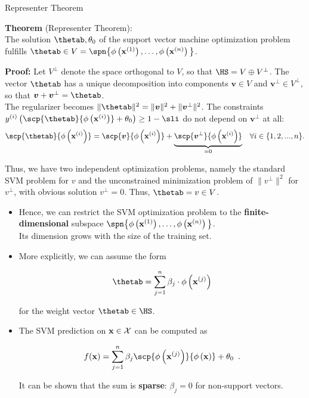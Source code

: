 \documentclass[11pt,compress,t,notes=noshow, xcolor=table]{beamer}
\begin{document}
\begin{vbframe}{Representer Theorem}

  \textbf{Theorem} (Representer Theorem):\\
  The solution $\thetab, \theta_0$ of the support vector machine optimization problem fulfills $\thetab \in V = \spn\big\{\phi\left(\xv^{(1)}\right), \dots, \phi\left(\xv^{(n)}\right)\big\}$.\\

  \vspace*{0.2cm}

  \begin{footnotesize}
  \textbf{Proof:} Let $V^\perp$ denote the space orthogonal to $V$,
  so that $\HS = V \oplus V^\perp$. The vector $\thetab$ has a
  unique decomposition into components $\bm{v} \in V$ and $\bm{v} ^\perp \in V^\perp$,
  so that $\bm{v}  + \bm{v} ^\perp = \thetab$.\\[0.5em]

  The regularizer becomes $\|\thetab\|^2 = \|\bm{v} \|^2 + \|\bm{v} ^\perp\|^2$.
  The constraints $\yi  \left( \scp{\thetab}{\phi\left(\xi\right)} + \theta_0\right) \geq 1 - \sli$
  do not depend on $\bm{v} ^\perp$ at all:
  $$
    \scp{\thetab}{\phi\left(\xi\right)} = \scp{\bm{v} }{\phi\left(\xi\right)} + \underbrace{\scp{\bm{v}^\perp}{\phi\left(\xi \right)}}_{= 0}
    \enspace ~ \forall i \in \{1, 2, ..., n\}.
  $$

  Thus, we have two independent optimization problems, namely the
  standard SVM problem for $v$ and the unconstrained minimization
  problem of $\|v^\perp\|^2$ for $v^\perp$, with obvious solution
  $v^\perp = 0$. Thus, $\thetab = v \in V$.
  \end{footnotesize}

  \framebreak

  \begin{itemize}
    \item Hence, we can restrict the SVM optimization problem
    to the \textbf{finite-dimensional} subspace
    $\spn\big\{\phi\left(\xv^{(1)}\right), \dots, \phi\left(\xv^{(n)}\right)\big\}$.\\
    Its dimension grows with the size of the
    training set.
    \item More explicitly, we can assume the form
    \begin{footnotesize}
    $$ \thetab = \sum_{j=1}^n \beta_j \cdot \phi\left(\xv^{(j)}\right) $$
    \end{footnotesize}
    for the weight vector $\thetab\in \HS$.
      \item The SVM prediction on $\mathbf{x} \in \mathcal{X}$ can be computed as
    \begin{footnotesize}
    $$
    \fx = \sum_{j = 1}^n \beta_j \scp{\phi\left(\xv^{(j)}\right)}{\phi\left(\xv\right)} + \theta_0
    \enspace.
    $$
    \end{footnotesize}


    It can be shown that the sum is \textbf{sparse}: $\beta_j = 0$ for non-support vectors.

  \end{itemize}

\end{vbframe}

\endlecture
\end{document}
